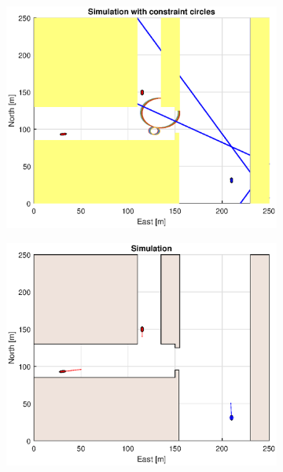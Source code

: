 \begin{figure}[!b]
\begin{subfigure}[b]{0.499\textwidth}
    \end{subfigure}
    \hfill
    \\
    \begin{subfigure}[b]{0.49\textwidth}
        \centering
        \includegraphics[width=\textwidth]{Images/Figures/Havn1/Simple0_f1_Frame2}
    \end{subfigure}
    \hfill
    \begin{subfigure}[b]{0.499\textwidth}
        \centering
        \includegraphics[width=\textwidth]{Images/Figures/Havn1/Simple0_f600_Frame2}

\end{subfigure}
\end{figure}
